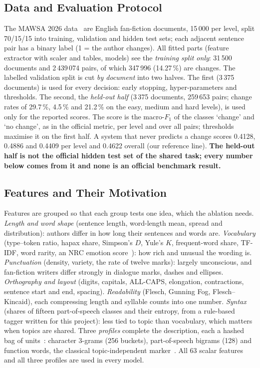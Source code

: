 \documentclass[runningheads]{llncs}
\begin{document}
\subsection{Data and Evaluation Protocol}

The MAWSA 2026 data~\cite{zangerle_2026_19068843,zangerle:2026} are English fan-fiction documents, 15\,000 per level, split 70/15/15 into training, validation and hidden test sets; each adjacent sentence pair has a binary label (1 = the author changes). All fitted parts (feature extractor with scaler and tables, models) see the \emph{training split only}: 31\,500 documents and 2\,439\,074 pairs, of which 347\,996 (14.27\,\%) are changes. The labelled validation split is cut \emph{by document} into two halves. The first (3\,375 documents) is used for every decision: early stopping, hyper-parameters and thresholds. The second, the \emph{held-out half} (3\,375 documents, 259\,653 pairs; change rates of 29.7\,\%, 4.5\,\% and 21.2\,\% on the easy, medium and hard levels), is used only for the reported scores. The score is the macro-$F_1$ of the classes `change' and `no change', as in the official metric, per level and over all pairs; thresholds maximise it on the first half. A system that never predicts a change scores 0.4128, 0.4886 and 0.4409 per level and 0.4622 overall (our reference line). \textbf{The held-out half is not the official hidden test set of the shared task; every number below comes from it and none is an official benchmark result.}

\subsection{Features and Their Motivation}

Features are grouped so that each group tests one idea, which the ablation needs. \emph{Length and word shape} (sentence length, word-length mean, spread and distribution): authors differ in how long their sentences and words are. \emph{Vocabulary} (type--token ratio, hapax share, Simpson's $D$, Yule's $K$, frequent-word share, TF-IDF, word rarity, an NRC emotion score~\cite{mohammad2013crowdsourcing}): how rich and unusual the wording is. \emph{Punctuation} (density, variety, the rate of twelve marks): largely unconscious, and fan-fiction writers differ strongly in dialogue marks, dashes and ellipses. \emph{Orthography and layout} (digits, capitals, ALL-CAPS, elongation, contractions, sentence start and end, spacing). \emph{Readability} (Flesch, Gunning Fog, Flesch--Kincaid), each compressing length and syllable counts into one number. \emph{Syntax} (shares of fifteen part-of-speech classes and their entropy, from a rule-based tagger written for this project): less tied to topic than vocabulary, which matters when topics are shared. Three \emph{profiles} complete the description, each a hashed bag of units~\cite{weinberger2009hashing}: character 3-grams (256 buckets), part-of-speech bigrams (128) and function words, the classical topic-independent marker~\cite{mosteller1964inference}. All 63 scalar features and all three profiles are used in every model.
\end{document}

